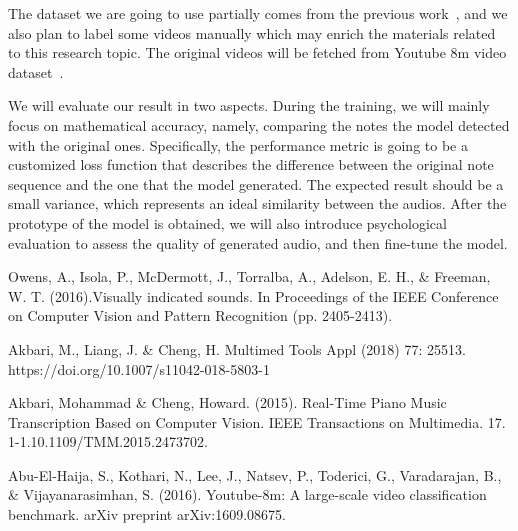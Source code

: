 \documentclass[10pt,letterpaper]{article}
\begin{document}
The dataset we are going to use partially comes from the previous work~\cite{B}, and we also plan to label some videos manually which may enrich the materials related to this research topic. The original videos will be fetched from Youtube 8m video dataset~\cite{D}.

We will evaluate our result in two aspects. During the training, we will mainly focus on mathematical accuracy, namely, comparing the notes the model detected with the original ones. Specifically, the performance metric is going to be a customized loss function that describes the difference between the original note sequence and the one that the model generated. The expected result should be a small variance, which represents an ideal similarity between the audios. After the prototype of the model is obtained, we will also introduce psychological evaluation to assess the quality of generated audio, and then fine-tune the model. 


\begin{thebibliography}{9}
    Owens, A., Isola, P., McDermott, J., Torralba, A., Adelson, E. H., \& Freeman, W. T. (2016).Visually indicated sounds. In Proceedings of  the IEEE Conference on Computer Vision and Pattern Recognition (pp. 2405-2413).    
    
    Akbari, M., Liang, J. \& Cheng, H. Multimed Tools Appl (2018) 77: 25513. https://doi.org/10.1007/s11042-018-5803-1
            
    Akbari, Mohammad \& Cheng, Howard. (2015). Real-Time Piano Music Transcription Based on Computer Vision. IEEE Transactions on Multimedia. 17. 1-1.10.1109/TMM.2015.2473702. 
    
    Abu-El-Haija, S., Kothari, N., Lee, J., Natsev, P., Toderici, G., Varadarajan, B., \& Vijayanarasimhan, S. (2016). Youtube-8m: A large-scale video classification benchmark. arXiv preprint arXiv:1609.08675.
            
    \end{thebibliography}
\end{document}
